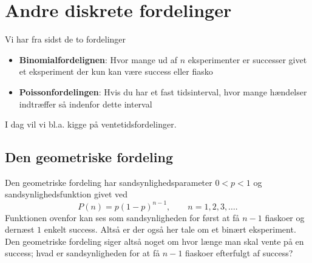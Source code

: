 
\section{Andre diskrete fordelinger}
Vi har fra sidst de to fordelinger
\begin{itemize}
  \item \textbf{Binomialfordelignen}: Hvor mange ud af $n$ eksperimenter er successer givet et eksperiment der kun kan være success eller fiasko
  \item \textbf{Poissonfordelingen}: Hvis du har et fast tidsinterval, hvor mange hændelser indtræffer så indenfor dette interval
\end{itemize}
I dag vil vi bl.a. kigge på ventetidsfordelinger.

\subsection{Den geometriske fordeling} \label{afs:forgeo}
Den geometriske fordeling har sandsynlighedsparameter $0 < p < 1$ og sandsynlighedsfunktion givet ved
\[ 
P(n) = p(1-p)^{n-1}, \qquad n = 1, 2, 3, \ldots 
.\]
Funktionen ovenfor kan ses som sandsynligheden for først at få $n-1$ fiaskoer og dernæst $1$ enkelt success. Altså er der også her tale om et binært eksperiment. Den geometriske fordeling siger altså noget om hvor længe man skal vente på en success; hvad er sandsynligheden for at få $n-1$ fiaskoer efterfulgt af success?

